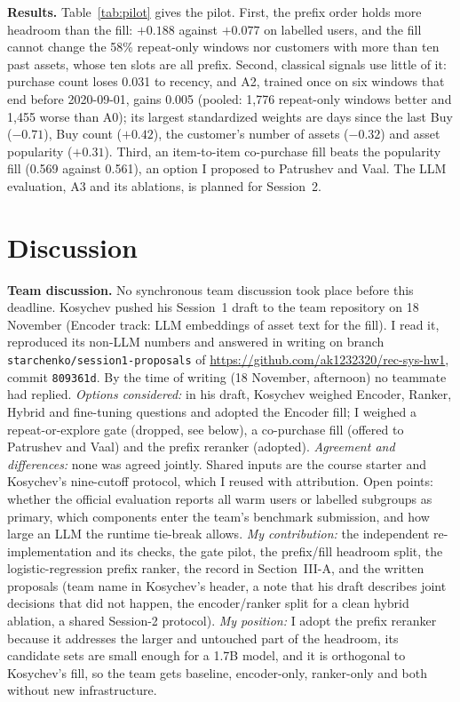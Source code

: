 \documentclass[conference]{IEEEtran}
\begin{document}
\textbf{Results.} Table~\ref{tab:pilot} gives the pilot. First, the prefix order holds more headroom than the fill: $+0.188$ against $+0.077$ on labelled users, and the fill cannot change the 58\% repeat-only windows nor customers with more than ten past assets, whose ten slots are all prefix. Second, classical signals use little of it: purchase count loses 0.031 to recency, and A2, trained once on six windows that end before 2020-09-01, gains 0.005 (pooled: 1{,}776 repeat-only windows better and 1{,}455 worse than A0); its largest standardized weights are days since the last Buy ($-0.71$), Buy count ($+0.42$), the customer's number of assets ($-0.32$) and asset popularity ($+0.31$). Third, an item-to-item co-purchase fill beats the popularity fill (0.569 against 0.561), an option I proposed to Patrushev and Vaal. The LLM evaluation, A3 and its ablations, is planned for Session~2.

\section{Discussion}

\textbf{Team discussion.} No synchronous team discussion took place before this deadline. Kosychev pushed his Session~1 draft to the team repository on 18 November (Encoder track: LLM embeddings of asset text for the fill). I read it, reproduced its non-LLM numbers and answered in writing on branch \texttt{starchenko/session1-proposals} of \url{https://github.com/ak1232320/rec-sys-hw1}, commit \texttt{809361d}. By the time of writing (18 November, afternoon) no teammate had replied. \emph{Options considered:} in his draft, Kosychev weighed Encoder, Ranker, Hybrid and fine-tuning questions and adopted the Encoder fill; I weighed a repeat-or-explore gate (dropped, see below), a co-purchase fill (offered to Patrushev and Vaal) and the prefix reranker (adopted). \emph{Agreement and differences:} none was agreed jointly. Shared inputs are the course starter and Kosychev's nine-cutoff protocol, which I reused with attribution. Open points: whether the official evaluation reports all warm users or labelled subgroups as primary, which components enter the team's benchmark submission, and how large an LLM the runtime tie-break allows. \emph{My contribution:} the independent re-implementation and its checks, the gate pilot, the prefix/fill headroom split, the logistic-regression prefix ranker, the record in Section~III-A, and the written proposals (team name in Kosychev's header, a note that his draft describes joint decisions that did not happen, the encoder/ranker split for a clean hybrid ablation, a shared Session-2 protocol). \emph{My position:} I adopt the prefix reranker because it addresses the larger and untouched part of the headroom, its candidate sets are small enough for a 1.7B model, and it is orthogonal to Kosychev's fill, so the team gets baseline, encoder-only, ranker-only and both without new infrastructure.
\end{document}
